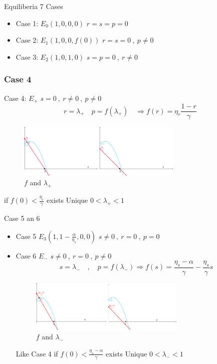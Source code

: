 \documentclass{beamer}
\begin{document}
\begin{frame}{Equiliberia}
  7 Cases 
\begin{itemize}
  \item Case 1: \(E_0 (1,0,0,0) \)   \(r = s = p = 0\)
  \item Case 2: \(E_1 (1,0,0,f(0)) \)   \( r = s = 0 \ , \ p \neq 0 \)
  \item Case 3: \(E_2 (1,0,1,0) \)   \( s = p = 0 \ , \ r \neq 0 \)
\end{itemize}
\end{frame}

\begin{frame}[shrink= 10]
  \frametitle{Case 4}
  Case 4: \(E_+ \)  \( s = 0 \ , \ r \neq 0 \ , \ p \neq 0 \) 
  \[ r = \lambda_+ \quad p = f(\lambda_+) \quad \Rightarrow f(r) = \eta_r \frac{1 - r}{\gamma} \]
  \vspace{-10mm}    
  \begin{figure}
      \includegraphics[width=0.7\textwidth]{1-s2.0-S1007570424005975-gr3.jpg}
      \caption{\(f\) and \(\lambda_+\)}
  \end{figure}
  \vspace{-5mm}
  if \( f(0)  < \frac{\eta_r}{\gamma} \) exists Unique \( 0 < \lambda_+ < 1 \)  
\end{frame}

\begin{frame}[shrink= 20]{Case 5 an 6 }
  \begin{itemize}
    \item Case 5 \(E_3(1,1-\frac{\alpha}{\eta_s},0,0)\)
   \(s \neq 0 \ , \ r = 0 \ , \ p = 0 \) 
    \item Case 6 \( E_- \) 
    \(s \neq 0 \ , \ r = 0 \ , \ p \neq 0 \) 
    \[ s = \lambda_- \quad , \quad p = f(\lambda_-) \Rightarrow f(s) = \frac{\eta_s- \alpha}{\gamma} - \frac{\eta_s}{\gamma}s\]
    
     \begin{figure}
    	\includegraphics[width=0.7\textwidth]{1-s2.0-S1007570424005975-gr4.jpg}
    	\caption{\(f\) and \(\lambda_-\)}
    \end{figure}
    
    Like Case 4 if \( f(0) < \frac{\eta_s- \alpha}{\gamma} \) exists Unique \( 0  < \lambda_- < 1 \) 
  \end{itemize}

\end{frame}
\end{document}
